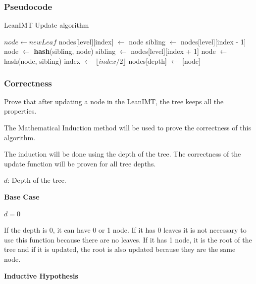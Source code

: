 \documentclass{article}
\begin{document}
\subsubsection{Pseudocode}

\begin{algorithm}[H]
    \caption{LeanIMT Update algorithm}\label{update}
    \begin{algorithmic}[1]
        \State $node\gets newLeaf$
        \State nodes[level][index] $\gets$ node
         
        \State sibling $\gets$ nodes[level][index - 1]
        \State node $\gets$ \textbf{hash}(sibling, node)
        \Else {}
        \State sibling $\gets$ nodes[level][index + 1]
         
        \State node $\gets$ hash(node, sibling)
        \EndIf
        \EndIf
        \State index $\gets$ $\lfloor index/2 \rfloor$ 
        \EndFor
        \State nodes[depth] $\gets$ [node] 
        \EndProcedure
    \end{algorithmic}
\end{algorithm}

\subsubsection{Correctness}
\label{sec:update-correctness}

Prove that after updating a node in the LeanIMT, the tree keeps all the properties.

The Mathematical Induction method will be used to prove the correctness of this algorithm.

The induction will be done using the depth of the tree. The correctness of the update function will be proven for all tree depths.

$d$: Depth of the tree.

\textbf{Base Case}

$d = 0$

If the depth is 0, it can have 0 or 1 node.
If it has 0 leaves it is not necessary to use this function because there are no leaves.
If it has 1 node, it is the root of the tree and if it is updated, the root is also updated because they are the same node.

\textbf{Inductive Hypothesis}
\end{document}
